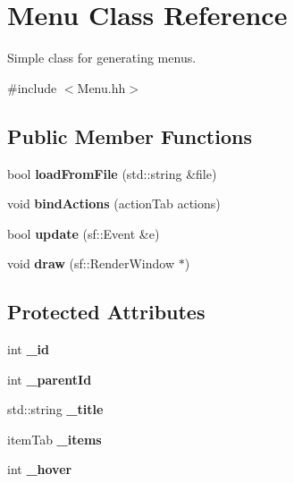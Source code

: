 \hypertarget{classMenu}{}\section{Menu Class Reference}
\label{classMenu}


Simple class for generating menus.  




{\ttfamily \#include $<$Menu.\+hh$>$}

\subsection*{Public Member Functions}
\begin{DoxyCompactItemize}
\item 
bool {\bfseries load\+From\+File} (std\+::string \&file)\hypertarget{classMenu_a61543e2fc03d1a1013d38ce4030e7b5c}{}\label{classMenu_a61543e2fc03d1a1013d38ce4030e7b5c}

\item 
void {\bfseries bind\+Actions} (action\+Tab actions)\hypertarget{classMenu_a5034819f60a84d58b33302825f05bdd8}{}\label{classMenu_a5034819f60a84d58b33302825f05bdd8}

\item 
bool {\bfseries update} (sf\+::\+Event \&e)\hypertarget{classMenu_acd6b589302d8825fe6a036c5d04b388b}{}\label{classMenu_acd6b589302d8825fe6a036c5d04b388b}

\item 
void {\bfseries draw} (sf\+::\+Render\+Window $\ast$)\hypertarget{classMenu_a19aedf143b363bd1e4c60113db06b626}{}\label{classMenu_a19aedf143b363bd1e4c60113db06b626}

\end{DoxyCompactItemize}
\subsection*{Protected Attributes}
\begin{DoxyCompactItemize}
\item 
int {\bfseries \+\_\+id}\hypertarget{classMenu_a4871f5c25e4feefc152174bb5f4848ed}{}\label{classMenu_a4871f5c25e4feefc152174bb5f4848ed}

\item 
int {\bfseries \+\_\+parent\+Id}\hypertarget{classMenu_acc99927a31ff10e802ec6dca998e9590}{}\label{classMenu_acc99927a31ff10e802ec6dca998e9590}

\item 
std\+::string {\bfseries \+\_\+title}\hypertarget{classMenu_ad9ce4935c5ea4c32954195d692a873bd}{}\label{classMenu_ad9ce4935c5ea4c32954195d692a873bd}

\item 
item\+Tab {\bfseries \+\_\+items}\hypertarget{classMenu_a0376395345d2c4384a13fb6d063ed46f}{}\label{classMenu_a0376395345d2c4384a13fb6d063ed46f}

\item 
int {\bfseries \+\_\+hover}\hypertarget{classMenu_a288802cb3a6c898322ba61bbcb6da966}{}\label{classMenu_a288802cb3a6c898322ba61bbcb6da966}

\end{DoxyCompactItemize}


